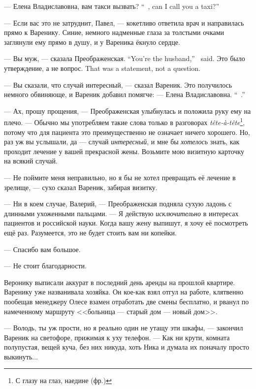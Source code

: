 {--- Елена Владиславовна, вам такси вызвать?}
{``\Yelena\ \Vladislavovna, can I call you a taxi?''}

--- Если вас это не затруднит, Павел, --- кокетливо ответила врач и направилась прямо к Варенику.
Синие, немного надменные глаза за толстыми очками заглянули ему прямо в душу, и у Вареника ёкнуло сердце.

{--- Вы муж, --- сказала Преображенская.}
{``You're the husband,'' \Preobrazhenskaya\ said.}
{Это было утверждение, а не вопрос.}
{That was a statement, not a question.}

--- Вы сказали, что случай интересный, --- сказал Вареник.
Это получилось немного обвиняюще, и Вареник добавил помягче:
{--- Елена Владиславовна.}
{``\Yelena\ \Vladislavovna.''}

--- Ах, прошу прощения, --- Преображенская улыбнулась и положила руку ему на плечо.
--- Обычно мы употребляем такие слова только в разговорах \textit{tête-à-tête}\footnote{С глазу на глаз, наедине (фр.)}, потому что для пациента это преимущественно не означает ничего хорошего.
Но, раз уж вы услышали, да --- случай \emph{интересный}, и мне бы \emph{хотелось} знать, как проходит лечение у вашей прекрасной жены.
Возьмите мою визитную карточку на всякий случай.

--- Не поймите меня неправильно, но я бы не хотел превращать её лечение в зрелище, --- сухо сказал Вареник, забирая визитку.

--- Ни в коем случае, Валерий, --- Преображенская подняла сухую ладонь с длинными ухоженными пальцами.
--- Я действую \emph{исключительно} в интересах пациентов и российской науки.
Когда вашу жену выпишут, я хочу её посмотреть ещё раз.
Разумеется, это не будет стоить вам ни копейки.

--- Спасибо вам большое.

--- Не стоит благодарности.

\textspace

\asterism

Веронику выписали аккурат в последний день аренды на прошлой квартире.
Варенику уже названивала хозяйка.
Он кое-как взял отгул на работе, клятвенно пообещав менеджеру Олесе взамен отработать две смены бесплатно, и рванул по намеченному маршруту <<больница --- старый дом --- новый дом>>.

--- Володь, ты уж прости, но я реально один не утащу эти шкафы, --- закончил Вареник на светофоре, прижимая к уху телефон.
--- Как ни крути, комната полупустая, вещей куча, без них никуда, хоть Ника и думала их поначалу просто выкинуть...

